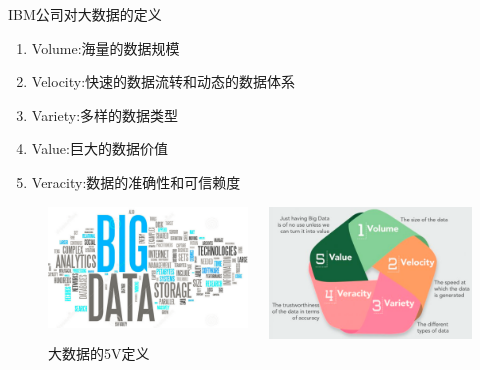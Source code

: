 \documentclass{beamerthemeMono}
\begin{document}
\begin{frame}[t]{\subsecname}
\begin{goodbox}{IBM公司对大数据的定义}
\begin{enumerate}\footnotesize
    \item Volume:海量的数据规模
    \item Velocity:快速的数据流转和动态的数据体系
    \item Variety:多样的数据类型
    \item Value:巨大的数据价值
    \item Veracity:数据的准确性和可信赖度
\end{enumerate}
\end{goodbox}

\begin{figure}
\begin{columns}
  \begin{column}{.5\textwidth}
      \includegraphics[height=0.35\textheight]{chp01_文字云.png}
  \end{column}
  \begin{column}{.5\textwidth}
      \includegraphics[height=0.35\textheight]{chp01_5V.png}
  \end{column}
\end{columns}
\caption{大数据的5V定义}
\end{figure}
\end{frame}
\end{document}

